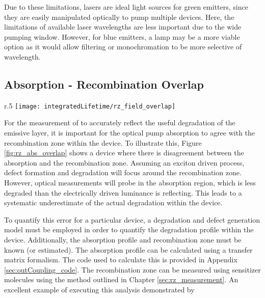 \documentclass[../thesis.tex]{subfiles}
\begin{document}
Due to these limitations, lasers are ideal light sources for green emitters, since they are easily manipulated optically to pump multiple devices.
Here, the limitations of available laser wavelengths are less important due to the wide pumping window.
However, for blue emitters, a lamp may be a more viable option as it would allow filtering or monochromation to be more selective of wavelength.



\subsection{Absorption - Recombination Overlap}\label{sec:abs_rz_overlap}

\begin{wrapfigure}{r}{.5\textwidth}
\centering
\texttt{[image: integratedLifetime/rz\_field\_overlap]}
\caption{Exciton recombination zone (RZ) and pump intensity $|E|^2$ for a hypothetical thick EML device are shown.}
\label{fig:rz_abs_overlap}
\end{wrapfigure}


For the measurement of \pl to accurately reflect the useful degradation of the emissive layer, it is important for the optical pump absorption to agree with the recombination zone within the device.  
To illustrate this, Figure \ref{fig:rz_abs_overlap} shows a device where there is disagreement between the absorption and the recombination zone.  
Assuming an exciton driven process, defect formation and degradation will focus around the recombination zone.
However, optical measurements will probe in the absorption region, which is less degraded than the electrically driven luminance is reflecting.
This leads to a systematic underestimate of the actual \pl degradation within the device.

To quantify this error for a particular device, a degradation and defect generation model must be employed in order to quantify the degradation profile within the device.  
Additionally, the absorption profile and recombination zone must be known (or estimated).
The absorption profile can be calculated using a transfer matrix formalism.\supercite{Pettersson1999}
The code used to calculate this is provided in Appendix \ref{sec:outCoupling_code}.
The recombination zone can be measured using sensitizer molecules using the method outlined in Chapter \ref{sec:rz_measurement}.
An excellent example of executing this analysis demonstrated by \textcite{Bangsund2018}
\end{document}

